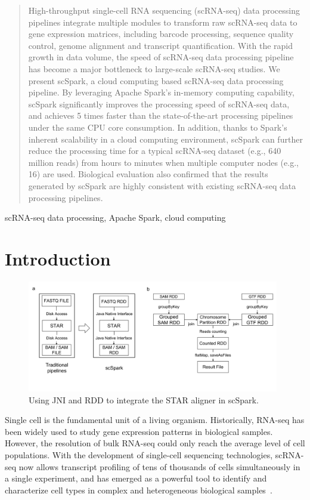 \documentclass[conference]{IEEEtran}
\begin{document}
\begin{abstract}
High-throughput single-cell RNA sequencing (scRNA-seq) data processing pipelines integrate multiple modules to transform raw scRNA-seq data to gene expression matrices, including barcode processing, sequence quality control, genome alignment and transcript quantification.
With the rapid growth in data volume, the speed of scRNA-seq data processing pipeline has become a major bottleneck to large-scale scRNA-seq studies. 
We present scSpark, a cloud computing based scRNA-seq data processing pipeline. 
By leveraging Apache Spark's in-memory computing capability, scSpark significantly improves the processing speed of scRNA-seq data, and achieves 5 times faster than the state-of-the-art processing pipelines under the same CPU core consumption.
In addition, thanks to Spark's inherent scalability in a cloud computing environment, scSpark can further reduce the processing time for a typical scRNA-seq dataset (e.g., 640 million reads) from hours to minutes when multiple computer nodes (e.g., 16) are used.  
Biological evaluation also confirmed that the results generated by scSpark are highly consistent with existing scRNA-seq data processing pipelines.
\end{abstract}

\begin{IEEEkeywords}
scRNA-seq data processing, Apache Spark, cloud computing
\end{IEEEkeywords}

\section{Introduction}
\begin{figure}
	\centering
	\includegraphics[width=0.98\textwidth]{fig1.pdf}
	\caption{Using JNI and RDD to integrate the STAR aligner in scSpark.} \label{fig1}
\end{figure}
Single cell is the fundamental unit of a living organism.
Historically, RNA-seq has been widely used to study gene expression patterns in biological samples.
However, the resolution of bulk RNA-seq could only reach the average level of cell populations. 
With the development of single-cell sequencing technologies, scRNA-seq now allows transcript profiling of tens of thousands of cells simultaneously in a single experiment, and has emerged as a powerful tool to identify and characterize cell types in complex and heterogeneous biological samples~\cite{Zhang2019ComparativeAO}.
\end{document}
